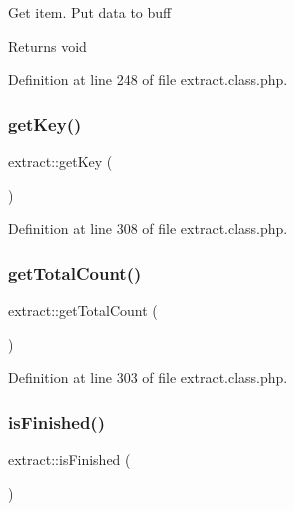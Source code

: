 Get item. Put data to buff \begin{DoxyReturn}{Returns}
void 
\end{DoxyReturn}


Definition at line 248 of file extract.\+class.\+php.

\hypertarget{classextract_a0737ef550d78c7a4441e196e7459bf8c}{}\label{classextract_a0737ef550d78c7a4441e196e7459bf8c} 
\subsubsection{\texorpdfstring{get\+Key()}{getKey()}}
{\footnotesize\ttfamily extract\+::get\+Key (\begin{DoxyParamCaption}{ }\end{DoxyParamCaption})}



Definition at line 308 of file extract.\+class.\+php.

\hypertarget{classextract_a5a9d910ed0ef78b9b8bb2631066949e7}{}\label{classextract_a5a9d910ed0ef78b9b8bb2631066949e7} 
\subsubsection{\texorpdfstring{get\+Total\+Count()}{getTotalCount()}}
{\footnotesize\ttfamily extract\+::get\+Total\+Count (\begin{DoxyParamCaption}{ }\end{DoxyParamCaption})}



Definition at line 303 of file extract.\+class.\+php.

\hypertarget{classextract_a02b3463a94c24f1f63c4a68bacc86607}{}\label{classextract_a02b3463a94c24f1f63c4a68bacc86607} 
\subsubsection{\texorpdfstring{is\+Finished()}{isFinished()}}
{\footnotesize\ttfamily extract\+::is\+Finished (\begin{DoxyParamCaption}{ }\end{DoxyParamCaption})}




